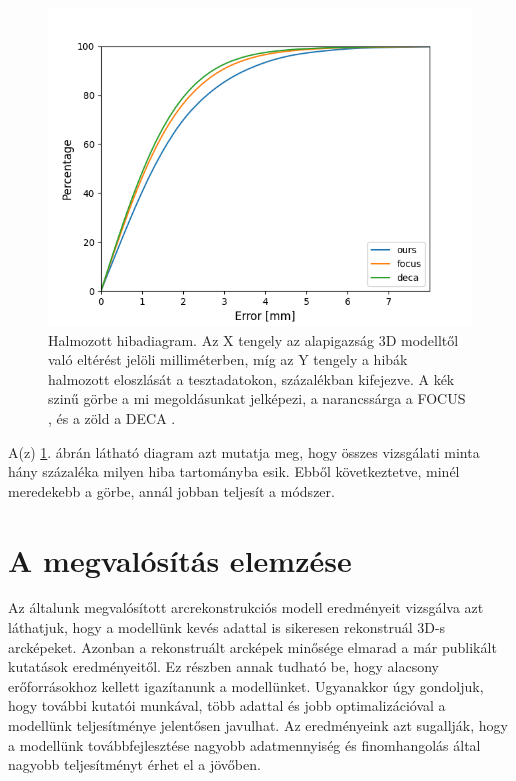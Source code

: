 \documentclass[12pt,a4]{article}
\begin{document}
            \begin{figure}[h]	
    		      \centering
    		      \includegraphics[width=1\linewidth]{cummulative-error.png}
                \caption{Halmozott hibadiagram. Az X tengely az alapigazság 3D modelltől való eltérést jelöli milliméterben, míg az Y tengely a hibák halmozott eloszlását a tesztadatokon, százalékban kifejezve. A kék szinű görbe a mi megoldásunkat jelképezi, a narancssárga a FOCUS \cite{focus}, és a zöld a DECA \cite{deca}.}
                 \label{fig:cummulative-error}
    	    \end{figure} 

            A(z) \ref{fig:cummulative-error}. ábrán látható diagram azt mutatja meg, hogy összes vizsgálati minta hány százaléka milyen hiba tartományba esik. Ebből következtetve, minél meredekebb a görbe, annál jobban teljesít a módszer.
    
    \section{A megvalósítás elemzése}

        Az általunk megvalósított arcrekonstrukciós modell eredményeit vizsgálva azt láthatjuk, hogy a modellünk kevés adattal is sikeresen rekonstruál 3D-s arcképeket. Azonban a rekonstruált arcképek minősége elmarad a már publikált kutatások eredményeitől. Ez részben annak tudható be, hogy alacsony erőforrásokhoz kellett igazítanunk a modellünket. Ugyanakkor úgy gondoljuk, hogy további kutatói munkával, több adattal és jobb optimalizációval a modellünk teljesítménye jelentősen javulhat. Az eredményeink azt sugallják, hogy a modellünk továbbfejlesztése nagyobb adatmennyiség és finomhangolás által nagyobb teljesítményt érhet el a jövőben. 
\end{document}
